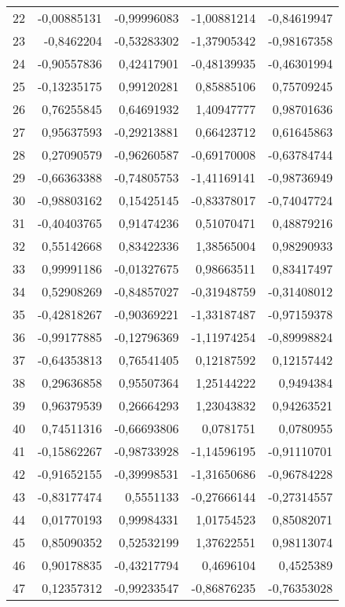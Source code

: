 \begin{longtable}{lrrrr}
 22 & -0,00885131 & -0,99996083 & -1,00881214 & -0,84619947 \\
 23 & -0,8462204 & -0,53283302 & -1,37905342 & -0,98167358 \\
 24 & -0,90557836 & 0,42417901 & -0,48139935 & -0,46301994 \\
 25 & -0,13235175 & 0,99120281 & 0,85885106 & 0,75709245 \\
 26 & 0,76255845 & 0,64691932 & 1,40947777 & 0,98701636 \\
 27 & 0,95637593 & -0,29213881 & 0,66423712 & 0,61645863 \\
 28 & 0,27090579 & -0,96260587 & -0,69170008 & -0,63784744 \\
 29 & -0,66363388 & -0,74805753 & -1,41169141 & -0,98736949 \\
 30 & -0,98803162 & 0,15425145 & -0,83378017 & -0,74047724 \\
 31 & -0,40403765 & 0,91474236 & 0,51070471 & 0,48879216 \\
 32 & 0,55142668 & 0,83422336 & 1,38565004 & 0,98290933 \\
 33 & 0,99991186 & -0,01327675 & 0,98663511 & 0,83417497 \\
 34 & 0,52908269 & -0,84857027 & -0,31948759 & -0,31408012 \\
 35 & -0,42818267 & -0,90369221 & -1,33187487 & -0,97159378 \\
 36 & -0,99177885 & -0,12796369 & -1,11974254 & -0,89998824 \\
 37 & -0,64353813 & 0,76541405 & 0,12187592 & 0,12157442 \\
 38 & 0,29636858 & 0,95507364 & 1,25144222 &  0,9494384 \\
 39 & 0,96379539 & 0,26664293 & 1,23043832 & 0,94263521 \\
 40 & 0,74511316 & -0,66693806 &  0,0781751 &  0,0780955 \\
 41 & -0,15862267 & -0,98733928 & -1,14596195 & -0,91110701 \\
 42 & -0,91652155 & -0,39998531 & -1,31650686 & -0,96784228 \\
 43 & -0,83177474 &  0,5551133 & -0,27666144 & -0,27314557 \\
 44 & 0,01770193 & 0,99984331 & 1,01754523 & 0,85082071 \\
 45 & 0,85090352 & 0,52532199 & 1,37622551 & 0,98113074 \\
 46 & 0,90178835 & -0,43217794 &  0,4696104 &  0,4525389 \\
 47 & 0,12357312 & -0,99233547 & -0,86876235 & -0,76353028 \\

\end{longtable}
